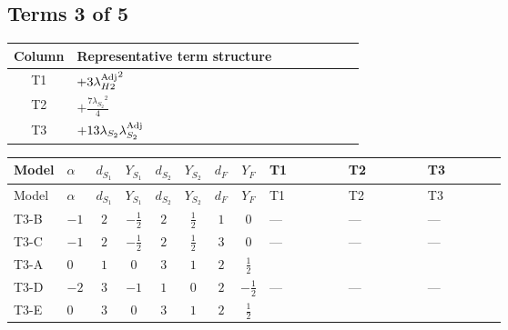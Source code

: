 \documentclass[8pt]{article}
\begin{document}
\begin{landscape}
\subsection*{Terms 3 of 5}
\begin{center}
\begin{tabular}{@{}c >{\raggedright\arraybackslash}p{0.82\linewidth}@{}}
\toprule
Column & Representative term structure \\
\midrule
T1 & \(\displaystyle +3 {\lambda_{H2}^{\rm Adj}}^2\) \\
\midrule
T2 & \(\displaystyle +\frac{7 {\lambda_{S_2}}^2}{4}\) \\
\midrule
T3 & \(\displaystyle +13 {\lambda_{S_2}} {\lambda_{S_2}^{\rm Adj}}\) \\
\midrule
\bottomrule
\end{tabular}
\end{center}
\smallskip
\tiny
\begin{longtable}{@{}llcccccc >{\raggedright\arraybackslash}p{0.21\linewidth} >{\raggedright\arraybackslash}p{0.21\linewidth} >{\raggedright\arraybackslash}p{0.21\linewidth}@{}}
\toprule
Model & $\alpha$ & $d_{S_1}$ & $Y_{S_1}$ & $d_{S_2}$ & $Y_{S_2}$ & $d_F$ & $Y_F$ & T1 & T2 & T3 \\
\midrule
\endfirsthead
\toprule
Model & $\alpha$ & $d_{S_1}$ & $Y_{S_1}$ & $d_{S_2}$ & $Y_{S_2}$ & $d_F$ & $Y_F$ & T1 & T2 & T3 \\
\midrule
\endhead
T3-B & $-1$ & $2$ & $-\frac{1}{2}$ & $2$ & $\frac{1}{2}$ & $1$ & $0$ & --- & --- & --- \\
\midrule
T3-C & $-1$ & $2$ & $-\frac{1}{2}$ & $2$ & $\frac{1}{2}$ & $3$ & $0$ & --- & --- & --- \\
\midrule
T3-A & $0$ & $1$ & $0$ & $3$ & $1$ & $2$ & $\frac{1}{2}$ & \scriptsize\adjustbox{max width=\linewidth}{$\begin{gathered} +3 {\lambda_{H2}^{\rm Adj}}^2\end{gathered}$} & \scriptsize\adjustbox{max width=\linewidth}{$\begin{gathered} +\frac{7 {\lambda_{S_2}}^2}{4}\end{gathered}$} & \scriptsize\adjustbox{max width=\linewidth}{$\begin{gathered} +13 {\lambda_{S_2}} {\lambda_{S_2}^{\rm Adj}}\end{gathered}$} \\
\midrule
T3-D & $-2$ & $3$ & $-1$ & $1$ & $0$ & $2$ & $-\frac{1}{2}$ & --- & --- & --- \\
\midrule
T3-E & $0$ & $3$ & $0$ & $3$ & $1$ & $2$ & $\frac{1}{2}$ & \scriptsize\adjustbox{max width=\linewidth}{$\begin{gathered} +3 {\lambda_{H2}^{\rm Adj}}^2\end{gathered}$} & \scriptsize\adjustbox{max width=\linewidth}{$\begin{gathered} +\frac{7 {\lambda_{S_2}}^2}{4}\end{gathered}$} & \scriptsize\adjustbox{max width=\linewidth}{$\begin{gathered} +13 {\lambda_{S_2}} {\lambda_{S_2}^{\rm Adj}}\end{gathered}$} \\
\midrule
\bottomrule
\end{longtable}
\clearpage

\end{landscape}
\end{document}

